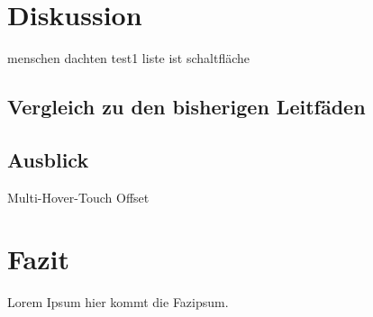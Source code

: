 \documentclass[a4paper,12pt,bibliography=totoc]{scrreprt}%
\begin{document}
\chapter{Diskussion}
menschen dachten test1 liste ist schaltfläche

\section{Vergleich zu den bisherigen Leitfäden}


\section{Ausblick}
Multi-Hover-Touch
Offset

\chapter{Fazit}
Lorem Ipsum hier kommt die Fazipsum.
\end{document}
